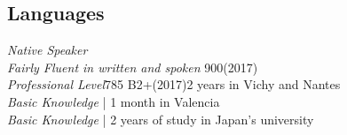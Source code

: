 \documentclass[]{deedy-resume-openfont}
\begin{document}
\begin{minipage}[t]{0.66\textwidth}
\subsection{Languages}
 \emph{Native Speaker}\\
 \emph{Fairly Fluent in written and spoken} \href{https://www.etsglobal.org/Fr/Fre}{}900(2017) \\
 \emph{Professional Level}\href{http://www.etsglobal.org/Fr/Fre/Tests-et-preparation/Le-test-TFI}{}785 B2+(2017)2 years in Vichy and Nantes\\
\vspace{0.5mm}
 \emph{Basic Knowledge} | 1 month in Valencia\\
 \emph{Basic Knowledge} | 2 years of study in Japan's university
\sectionsep






\end{minipage} 
\end{document}

